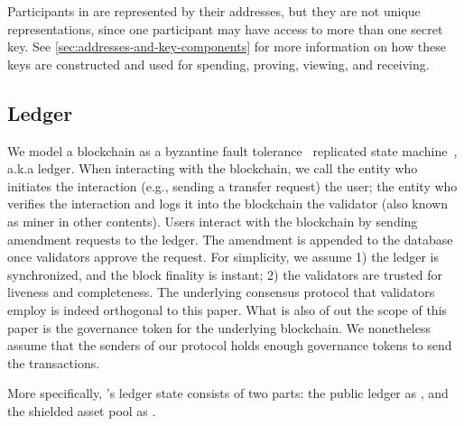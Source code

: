 Participants in \MantaPay{} are represented by their addresses, but they are not unique representations, since one participant may have access to more than one secret key. See \autoref{sec:addresses-and-key-components} for more information on how these keys are constructed and used for spending, proving, viewing, and receiving.

\subsection{Ledger}

We model a blockchain as a byzantine fault tolerance~\cite{bft} replicated state
machine~\cite{smr}, a.k.a ledger. When interacting with the blockchain, we call the entity who
initiates the interaction (e.g., sending a transfer request) the user; the entity who verifies the interaction and
logs it into the blockchain the validator (also known as miner in other contents). Users interact with the
blockchain by sending amendment requests to the ledger. The amendment is appended to the database once
validators approve the request. For simplicity, we assume 1) the ledger is synchronized, and the block finality
is instant; 2) the validators are trusted for liveness and completeness. The underlying consensus protocol
that validators employ is indeed orthogonal to this paper. What is also of out the scope of this paper is
the governance token for the underlying blockchain. We nonetheless assume that the senders of our protocol
holds enough governance tokens to send the transactions.

More specifically, \MantaPay{}'s ledger state \Ledger{} consists of two parts: the public ledger as \PublicLedger{}, and the shielded asset pool as \ShieldedAssetPool{}.

\begin{center}
    \vspace{1em}
    \begin{mdframed}[leftmargin=0.2\textwidth, rightmargin=0.2\textwidth]
        \begin{center}
        \end{center}
    \end{mdframed}
    \vspace{-1em}
\end{center}

